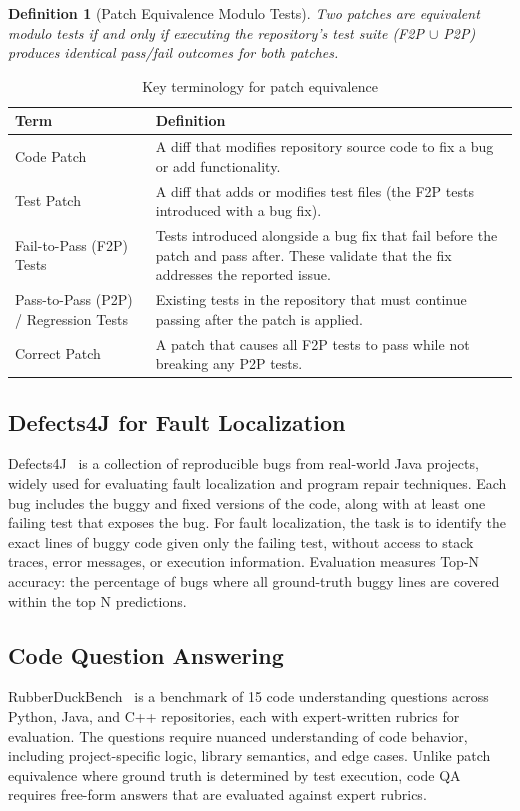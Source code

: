 \documentclass[]{meta}
\newtheorem{definition}{Definition}
\begin{document}
\begin{definition}[Patch Equivalence Modulo Tests]
Two patches are equivalent modulo tests if and only if executing the repository's test suite (F2P $\cup$ P2P) produces identical pass/fail outcomes for both patches.
\end{definition}

\begin{table}[h]
\centering
\caption{Key terminology for patch equivalence}
\label{tab:definitions}
\begin{tabular}{p{3.5cm}p{9cm}}
\toprule
\textbf{Term} & \textbf{Definition} \\
\midrule
Code Patch & A diff that modifies repository source code to fix a bug or add functionality. \\
Test Patch & A diff that adds or modifies test files (the F2P tests introduced with a bug fix). \\
Fail-to-Pass (F2P) Tests & Tests introduced alongside a bug fix that fail before the patch and pass after. These validate that the fix addresses the reported issue. \\
Pass-to-Pass (P2P) / Regression Tests & Existing tests in the repository that must continue passing after the patch is applied. \\
Correct Patch & A patch that causes all F2P tests to pass while not breaking any P2P tests. \\
\bottomrule
\end{tabular}
\end{table}

\subsection{Defects4J for Fault Localization}
Defects4J~\cite{just2014defects4j} is a collection of reproducible bugs from real-world Java projects, widely used for evaluating fault localization and program repair techniques. Each bug includes the buggy and fixed versions of the code, along with at least one failing test that exposes the bug. For fault localization, the task is to identify the exact lines of buggy code given only the failing test, without access to stack traces, error messages, or execution information. Evaluation measures Top-N accuracy: the percentage of bugs where all ground-truth buggy lines are covered within the top N predictions.

\subsection{Code Question Answering}
RubberDuckBench~\cite{rubberduckbench} is a benchmark of 15 code understanding questions across Python, Java, and C++ repositories, each with expert-written rubrics for evaluation. The questions require nuanced understanding of code behavior, including project-specific logic, library semantics, and edge cases. Unlike patch equivalence where ground truth is determined by test execution, code QA requires free-form answers that are evaluated against expert rubrics.
\end{document}

